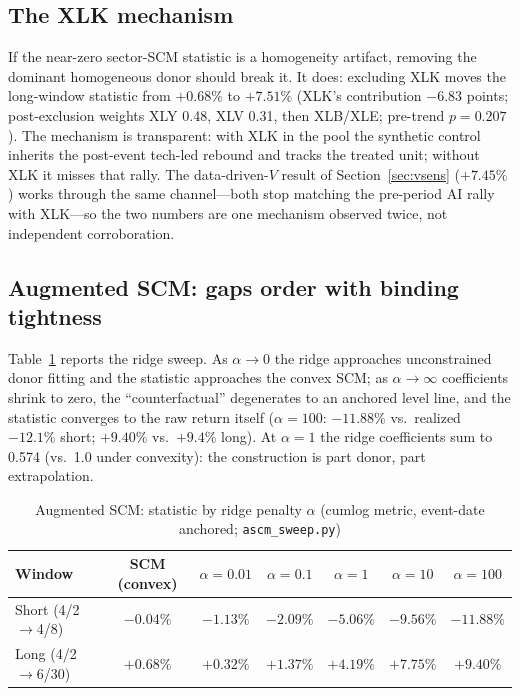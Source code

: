 \documentclass[11pt,a4paper]{article}
\begin{document}
\subsection{The XLK mechanism}\label{sec:exxlk}

If the near-zero sector-SCM statistic is a homogeneity artifact, removing
the dominant homogeneous donor should break it. It does: excluding XLK
moves the long-window statistic from $+0.68\%$ to $+7.51\%$ (XLK's
contribution $-6.83$ points; post-exclusion weights XLY 0.48, XLV 0.31,
then XLB/XLE; pre-trend $p=0.207$). The mechanism is transparent: with
XLK in the pool the synthetic control inherits the post-event tech-led
rebound and tracks the treated unit; without XLK it misses that rally.
The data-driven-$V$ result of Section~\ref{sec:vsens} ($+7.45\%$) works
through the same channel---both stop matching the pre-period AI rally
with XLK---so the two numbers are one mechanism observed twice, not
independent corroboration.

\subsection{Augmented SCM: gaps order with binding tightness}
\label{sec:ascm}

Table~\ref{tab:ascm} reports the ridge sweep. As $\alpha\to0$ the ridge
approaches unconstrained donor fitting and the statistic approaches the
convex SCM; as $\alpha\to\infty$ coefficients shrink to zero, the
``counterfactual'' degenerates to an anchored level line, and the statistic
converges to the raw return itself ($\alpha=100$: $-11.88\%$ vs.\ realized
$-12.1\%$ short; $+9.40\%$ vs.\ $+9.4\%$ long). At $\alpha=1$ the ridge
coefficients sum to 0.574 (vs.\ 1.0 under convexity): the construction is
part donor, part extrapolation.

\begin{table}[htbp]
\centering
\caption{Augmented SCM: statistic by ridge penalty $\alpha$ (cumlog
metric, event-date anchored; \texttt{ascm\_sweep.py})}
\label{tab:ascm}
\small
\begin{tabular}{@{}lcccccc@{}}
\toprule
Window & SCM (convex) & $\alpha{=}0.01$ & $\alpha{=}0.1$ & $\alpha{=}1$ &
$\alpha{=}10$ & $\alpha{=}100$ \\
\midrule
Short (4/2$\to$4/8) & $-0.04\%$ & $-1.13\%$ & $-2.09\%$ & $-5.06\%$ &
$-9.56\%$ & $-11.88\%$ \\
Long (4/2$\to$6/30) & $+0.68\%$ & $+0.32\%$ & $+1.37\%$ & $+4.19\%$ &
$+7.75\%$ & $+9.40\%$ \\
\bottomrule
\end{tabular}
\end{table}
\end{document}
